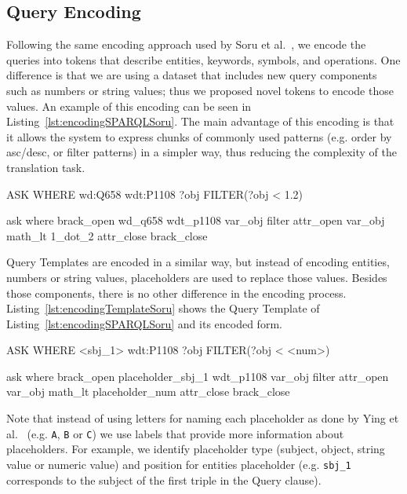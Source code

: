\subsection{Query Encoding}
\label{cap3:system/queryGenModule/encoding}
Following the same encoding approach used by Soru et al.~\cite{nmt:nspm-SoruMMPVEN17}, we 
encode the \SPARQL{} queries into tokens that describe entities, keywords, symbols, and 
operations. One difference is that we are using a dataset that includes new query components 
such as numbers or string values; thus we proposed novel tokens to encode those values. An 
example of this encoding can be seen in Listing~\ref{lst:encodingSPARQLSoru}. The main advantage of 
this encoding is that it allows the system to express chunks of commonly used patterns (e.g. 
order by asc/desc, or filter patterns) in a simpler way, thus reducing the complexity of the 
translation task.

\begin{sparqlcode}[%
    caption={\SPARQL{} query example with its encoded form.}, 
    label={lst:encodingSPARQLSoru}]
ASK WHERE { wd:Q658 wdt:P1108 ?obj FILTER(?obj < 1.2) }

ask where brack_open wd_q658 wdt_p1108 var_obj filter attr_open var_obj math_lt 1_dot_2 attr_close brack_close
\end{sparqlcode}

Query Templates are encoded in a similar way, but instead of encoding entities, numbers or 
string values, placeholders are used to replace those values. Besides those components, there 
is no other difference in the encoding process. Listing~\ref{lst:encodingTemplateSoru} shows 
the Query Template of Listing~\ref{lst:encodingSPARQLSoru} and its encoded form.

\begin{sparqlcode}[%
    caption={\SPARQL{} query example with its encoded form.}, 
    label={lst:encodingTemplateSoru}]
ASK WHERE { <sbj_1> wdt:P1108 ?obj FILTER(?obj < <num>) }

ask where brack_open placeholder_sbj_1 wdt_p1108 var_obj filter attr_open var_obj math_lt placeholder_num attr_close brack_close
\end{sparqlcode}

Note that instead of using letters for naming each placeholder as done by Ying et al.~\cite{nmt:nl-to-sparql-Yin19} 
(e.g. \texttt{A}, \texttt{B} or \texttt{C}) we use labels that provide more information about 
placeholders. For example, we identify placeholder type (subject, object, string value or 
numeric value) and position for entities placeholder (e.g. \texttt{sbj\_1} corresponds to the 
subject of the first triple in the Query clause).


